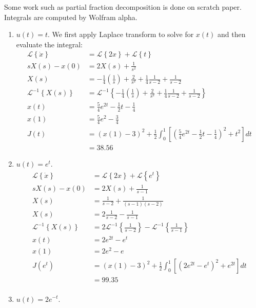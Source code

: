 \documentclass[12pt]{article}
\begin{document}
\begin{problem}[6]
Some work such as partial fraction decomposition is done on scratch paper. Integrals are computed by Wolfram alpha.
\begin{enumerate}[label=(\arabic*)]
\item $ u(t) = t$. We first apply Laplace transform to solve for $ x(t)$ and then evaluate the integral:
 \begin{align*}
	\mathcal{L}\left\{ \dot{x}\right\}  &= \mathcal{L}\left\{ 2x\right\} + \mathcal{L}\left\{ t\right\}  \\
	sX(s) - x(0)&= 2X(s) + \frac{1}{s^2} \\
	X(s) &= -\frac{1}{4} \left( \frac{1}{s} \right) + \frac{2}{s^2} + \frac{1}{4} \frac{1}{s-2} + \frac{1}{s-2}\\
	\mathcal{L}^{-1}\left\{ X(s)\right\} &= \mathcal{L}^{-1}\left\{ -\frac{1}{4} \left( \frac{1}{s} \right) + \frac{2}{s^2} + \frac{1}{4} \frac{1}{s-2} + \frac{1}{s-2}\right\}  \\
	x(t) &= \frac{5}{4} e^{2t}-\frac{1}{2}t -\frac{1}{4} \\
	x(1) &= \frac{5}{4}e^2 - \frac{3}{4} \\
	J(t) &= (x(1)-3)^2 + \frac{1}{2} \int_{ 0}^{ 1}\left[    \left( \frac{5}{4} e^{2t}-\frac{1}{2}t -\frac{1}{4} \right)^2 + t^2 \right] dt  \\
	&= 38.56 
\end{align*}
\item $ u(t) = e^{t}$.
\begin{align*}
	\mathcal{L}\left\{ \dot{x}\right\} &= \mathcal{L}\left\{ 2x\right\} + \mathcal{L}\left\{ e^{t}\right\}  \\
	sX(s) - x(0)&= 2X(s) + \frac{1}{s-1} \\
	X(s)&= \frac{1}{s-2} + \frac{1}{(s-1)(s-2)} \\
	X(s) &= 2\frac{1}{s-2}-\frac{1}{s-1} \\
	\mathcal{L}^{-1}\left\{ X(s)\right\} &= 2\mathcal{L}^{-1}\left\{ \frac{1}{s-2}\right\} - \mathcal{L}^{-1}\left\{ \frac{1}{s-1}\right\}  \\
	x(t)&= 2e^{2t}- e^{t} \\
	x(1) &= 2e ^2 - e \\
	J(e^t) &= (x(1)-3)^2 + \frac{1}{2} \int_{ 0}^{ 1}\left[    \left( 2 e^{2t}-e^t \right)^2 + e^{2t} \right] dt  \\
	&= 99.35 \\
\end{align*}
\item $ u(t) = 2e^{-t}$.

\end{enumerate}
\end{problem}
\end{document}
